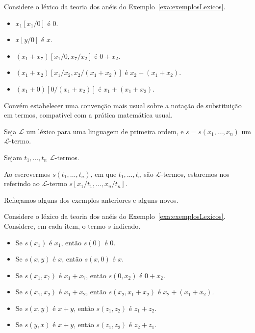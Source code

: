 \begin{example}\label{exa:substituicaoEmTermos}
    Considere o léxico da teoria dos anéis do Exemplo~\ref{exa:exemplosLexicos}.
    \begin{itemize}
        \item $x_1[x_1/0]$ é $0$.
        \item $x[y/0]$ é $x$.
        \item $(x_1 + x_7)[x_1/0, x_7/x_2]$ é $0 + x_2$.
        \item $(x_1 + x_2)[x_1/x_2, x_2/(x_1 + x_2)]$ é $x_2 + (x_1 + x_2)$.
        \item $(x_1 + 0)[0/(x_1 + x_2)]$ é $x_1 + (x_1 + x_2)$.
    \end{itemize}
\end{example}

Convém estabelecer uma convenção mais usual sobre a notação de substituição em termos, compatível com a prática matemática usual.
\begin{convention}\label{conv:substituicaoEmTermos}
    Seja $\mathcal L$ um léxico para uma linguagem de primeira ordem, e $s=s(x_1, \dots, x_n)$ um $\mathcal L$-termo.

    Sejam $t_1, \dots, t_n$ $\mathcal L$-termos.
    
    Ao escrevermos $s(t_1, \dots, t_n)$, em que $t_1, \dots, t_n$ são $\mathcal L$-termos, estaremos nos referindo ao $\mathcal L$-termo $s[x_1/t_1, \dots, x_n/t_n]$.
\end{convention}

Refaçamos alguns dos exemplos anteriores e alguns novos.

\begin{example}\label{exa:substituicaoEmTermos2}
    Considere o léxico da teoria dos anéis do Exemplo~\ref{exa:exemplosLexicos}.
    Considere, em cada item, o termo $s$ indicado.
    \begin{itemize}
        \item Se $s(x_1)$ é $x_1$, então $s(0)$ é $0$.
        \item Se $s(x, y)$ é $x$, então $s(x, 0)$ é $x$.
        \item Se $s(x_1, x_7)$ é $x_1 + x_7$, então $s(0, x_2)$ é $0 + x_2$.
        \item Se $s(x_1, x_2)$ é $x_1 + x_2$, então $s(x_2, x_1+x_2)$ é $x_2 + (x_1 + x_2)$.
        \item Se $s(x, y)$ é $x+y$, então $s(z_1, z_2)$ é $z_1 + z_2$.
        \item Se $s(y, x)$ é $x+y$, então $s(z_1, z_2)$ é $z_2 + z_1$.
    \end{itemize}
\end{example}

